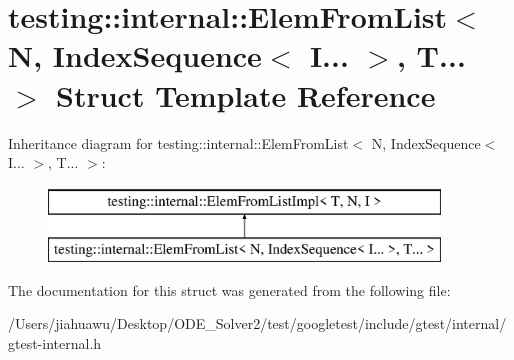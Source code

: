 \hypertarget{structtesting_1_1internal_1_1_elem_from_list_3_01_n_00_01_index_sequence_3_01_i_8_8_8_01_4_00_01_t_8_8_8_01_4}{}\section{testing\+:\+:internal\+:\+:Elem\+From\+List$<$ N, Index\+Sequence$<$ I... $>$, T... $>$ Struct Template Reference}
\label{structtesting_1_1internal_1_1_elem_from_list_3_01_n_00_01_index_sequence_3_01_i_8_8_8_01_4_00_01_t_8_8_8_01_4}
Inheritance diagram for testing\+:\+:internal\+:\+:Elem\+From\+List$<$ N, Index\+Sequence$<$ I... $>$, T... $>$\+:\begin{figure}[H]
\begin{center}
\leavevmode
\includegraphics[height=2.000000cm]{structtesting_1_1internal_1_1_elem_from_list_3_01_n_00_01_index_sequence_3_01_i_8_8_8_01_4_00_01_t_8_8_8_01_4}
\end{center}
\end{figure}


The documentation for this struct was generated from the following file\+:\begin{DoxyCompactItemize}
\item 
/\+Users/jiahuawu/\+Desktop/\+O\+D\+E\+\_\+\+Solver2/test/googletest/include/gtest/internal/gtest-\/internal.\+h\end{DoxyCompactItemize}
